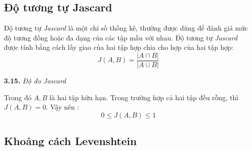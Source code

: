 \subsection{Độ tương tự Jascard}
Độ tương tự \textit{Jascard} là một chỉ số thống kê, thường được dùng để đánh giá mức độ tương đồng hoặc đa dạng của các tập mẫu với nhau. Độ tương tự \textit{Jascard} được tính bằng cách lấy giao của hai tập hợp chia cho hợp của hai tập hợp:
$$J(A,B) = \frac{|A \cap B|}{|A \cup B|}$$
\begin{center}

\vspace{0.1cm}
\textbf{3.15.} \textit{Độ đo Jascard}    
\end{center}
Trong đó $A, B$ là hai tập hữu hạn. Trong trường hợp cả hai tập đều rỗng, thì $J(A,B) = 0$. Vậy nên :
$$0 \leq J(A,B) \leq 1$$

\subsection{Khoảng cách Levenshtein}

